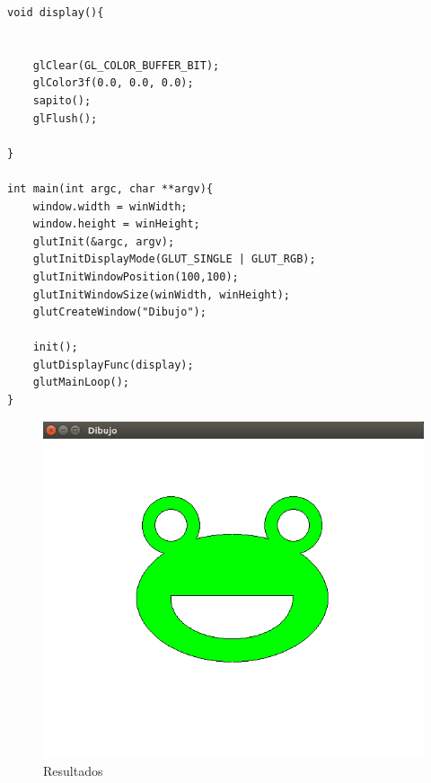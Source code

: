\documentclass[a4paper,12pt]{article}
\begin{document}
\begin{enumerate}
\begin{lstlisting}
void display(){
    

    glClear(GL_COLOR_BUFFER_BIT);
    glColor3f(0.0, 0.0, 0.0);
    sapito();
    glFlush();

}

int main(int argc, char **argv){
    window.width = winWidth;
    window.height = winHeight;
    glutInit(&argc, argv);
    glutInitDisplayMode(GLUT_SINGLE | GLUT_RGB);
    glutInitWindowPosition(100,100);
    glutInitWindowSize(winWidth, winHeight);
    glutCreateWindow("Dibujo");

    init();
    glutDisplayFunc(display);
    glutMainLoop();
}
 \end{lstlisting}
 
 \begin{figure}[H]
  \centering
  \includegraphics[scale = 0.5]{2.png}
  \caption{Resultados}
 \end{figure}





\end{enumerate}
\end{document}

